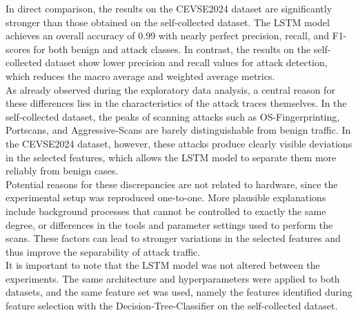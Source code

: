 In direct comparison, the results on the CEVSE2024 dataset are significantly stronger than those obtained on the self-collected dataset. The LSTM model achieves an overall accuracy of 0.99 with nearly perfect precision, recall, and F1-scores for both benign and attack classes. In contrast, the results on the self-collected dataset show lower precision and recall values for attack detection, which reduces the macro average and weighted average metrics.\\

As already observed during the exploratory data analysis, a central reason for these differences lies in the characteristics of the attack traces themselves. In the self-collected dataset, the peaks of scanning attacks such as OS-Fingerprinting, Portscans, and Aggressive-Scans are barely distinguishable from benign traffic. In the CEVSE2024 dataset, however, these attacks produce clearly visible deviations in the selected features, which allows the LSTM model to separate them more reliably from benign cases.\\

Potential reasons for these discrepancies are not related to hardware, since the experimental setup was reproduced one-to-one. More plausible explanations include background processes that cannot be controlled to exactly the same degree, or differences in the tools and parameter settings used to perform the scans. These factors can lead to stronger variations in the selected features and thus improve the separability of attack traffic. \\

It is important to note that the LSTM model was not altered between the experiments. The same architecture and hyperparameters were applied to both datasets, and the same feature set was used, namely the features identified during feature selection with the Decision-Tree-Classifier on the self-collected dataset.\\

